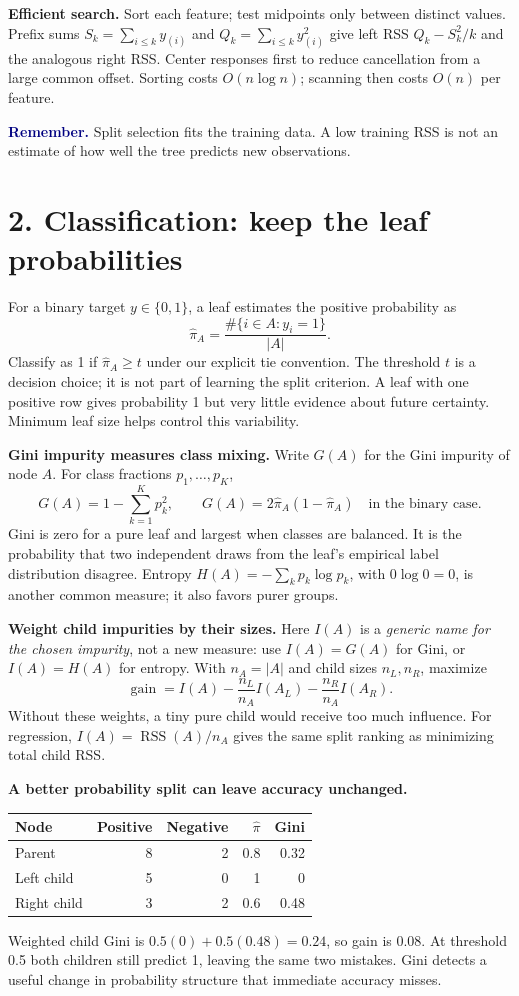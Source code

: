 \documentclass[11pt,a4paper]{article}
\newcommand{\idea}[1]{\textcolor{navy}{\textbf{Remember.}} #1}
\begin{document}
\textbf{Efficient search.} Sort each feature; test midpoints only between
distinct values. Prefix sums $S_k=\sum_{i\le k}y_{(i)}$ and
$Q_k=\sum_{i\le k}y_{(i)}^2$ give left RSS $Q_k-S_k^2/k$ and the analogous
right RSS. Center responses first to reduce cancellation from a large common
offset. Sorting costs $O(n\log n)$; scanning then costs $O(n)$ per feature.

\idea{Split selection fits the training data. A low training RSS is not an
estimate of how well the tree predicts new observations.}

\newpage
\section*{2. Classification: keep the leaf probabilities}
For a binary target $y\in\{0,1\}$, a leaf estimates the positive probability as
\[
\boxed{\widehat\pi_A=\frac{\#\{i\in A:y_i=1\}}{|A|}.}
\]
Classify as 1 if $\widehat\pi_A\ge t$ under our explicit tie convention.
The threshold $t$ is a decision choice; it is not part of learning the split
criterion. A leaf with one positive row gives probability 1 but very little
evidence about future certainty. Minimum leaf size helps control this variability.

\textbf{Gini impurity measures class mixing.}
Write $G(A)$ for the Gini impurity of node $A$. For class fractions $p_1,\ldots,p_K$,
\[
G(A)=1-\sum_{k=1}^Kp_k^2,\qquad
G(A)=2\widehat\pi_A(1-\widehat\pi_A)\quad\text{in the binary case}.
\]
Gini is zero for a pure leaf and largest when classes are balanced. It is the
probability that two independent draws from the leaf's empirical label distribution
disagree. Entropy $H(A)=-\sum_kp_k\log p_k$, with $0\log0=0$, is another
common measure; it also favors purer groups.

\textbf{Weight child impurities by their sizes.}
Here $I(A)$ is a \emph{generic name for the chosen impurity}, not a new measure:
use $I(A)=G(A)$ for Gini, or $I(A)=H(A)$ for entropy.
With $n_A=|A|$ and child sizes $n_L,n_R$, maximize
\[
\boxed{\operatorname{gain}=I(A)-\frac{n_L}{n_A}I(A_L)
-\frac{n_R}{n_A}I(A_R).}
\]
Without these weights, a tiny pure child would receive too much influence.
For regression, $I(A)=\operatorname{RSS}(A)/n_A$ gives the same split ranking
as minimizing total child RSS.

\textbf{A better probability split can leave accuracy unchanged.}
\begin{center}
\begin{tabular}{@{}lrrrr@{}}\toprule
Node & Positive & Negative & $\widehat\pi$ & Gini\\\midrule
Parent & 8 & 2 & 0.8 & 0.32\\
Left child & 5 & 0 & 1 & 0\\
Right child & 3 & 2 & 0.6 & 0.48\\\bottomrule
\end{tabular}
\end{center}
Weighted child Gini is $0.5(0)+0.5(0.48)=0.24$, so gain is $0.08$.
At threshold 0.5 both children still predict 1, leaving the same two mistakes.
Gini detects a useful change in probability structure that immediate accuracy misses.
\end{document}
